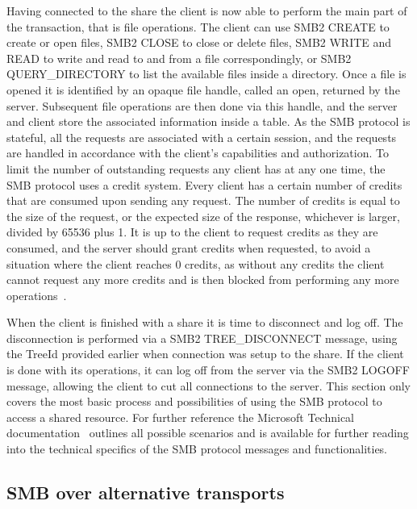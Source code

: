 \documentclass[english, 12pt, a4paper, elec, utf8, a-2b, online]{aaltothesis}
\begin{document}
Having connected to the share the client is now able to perform the main part of the
transaction, that is file operations. The client can use SMB2 CREATE to create
or open files, SMB2 CLOSE to close or delete files, SMB2 WRITE and READ to write and
read to and from a file correspondingly, or SMB2 QUERY\_DIRECTORY to list the available files inside
a directory.
Once a file is opened it is identified by an opaque file handle, called an open, returned by the server.
Subsequent file operations are then done via this handle, and the server and client
store the associated information inside a table.
As the SMB protocol is stateful, all the requests are associated with a certain
session, and the requests are handled in accordance with the client's capabilities
and authorization. To limit the number of outstanding requests any client has at
any one time, the SMB protocol uses a credit system. Every
client has a certain number of credits that are consumed upon sending any request.
The number of credits is equal to the size of the request, or the expected size of
the response, whichever is larger, divided by 65536 plus 1. It is up to the client
to request credits as they are consumed, and the server should grant credits when
requested, to avoid a situation where the client reaches 0 credits, as without
any credits the client cannot request any more credits and is then blocked from
performing any more operations~\cite{smb2_tech}.

When the client is finished with a share it is time to disconnect and log off. The
disconnection is performed via a SMB2 TREE\_DISCONNECT message, using the TreeId
provided earlier when connection was setup to the share. If the client is done with its
operations, it can log off from the server via the SMB2 LOGOFF message, allowing
the client to cut all connections to the server. This section only covers the most
basic process and possibilities of using the SMB protocol to access a shared resource.
For further reference the Microsoft Technical documentation~\cite{smb2_tech} outlines all possible
scenarios and is available for further reading into the technical specifics of the
SMB protocol messages and functionalities.

\subsection{SMB over alternative transports}
\end{document}
